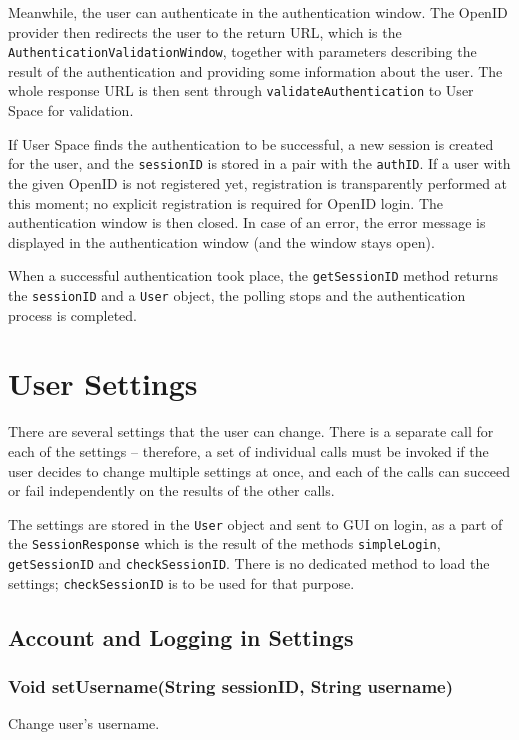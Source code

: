 {Meanwhile, the user can authenticate in the authentication window. The OpenID provider then redirects the user to the return URL, which is the {\tt AuthenticationValidationWindow}, together with parameters describing the result of the authentication and providing some information about the user.
The whole response URL is then sent through {\tt validateAuthentication} to User Space for validation.

If User Space finds the authentication to be successful, a new session is created for the user, and the {\tt sessionID} is stored in a pair with the {\tt authID}.
If a user with the given OpenID is not registered yet, registration is transparently performed at this moment; no explicit registration is required for OpenID login.
The authentication window is then closed.
In case of an error, the error message is displayed in the authentication window (and the window stays open).

When a successful authentication took place, the {\tt getSessionID} method returns the {\tt sessionID} and a {\tt User} object, the polling stops and the authentication process is completed.

\section{User Settings}
\label{sec:rpc:settings}

There are several settings that the user can change. There is a separate call for each of the settings -- therefore, a set of individual calls must be invoked if the user decides to change multiple settings at once, and each of the calls can succeed or fail independently on the results of the other calls.

The settings are stored in the {\tt User} object and sent to GUI on login, as a part of the {\tt SessionResponse} which is the result of the methods {\tt simpleLogin}, {\tt getSessionID} and {\tt checkSessionID}. There is no dedicated method to load the settings; {\tt checkSessionID} is to be used for that purpose.

\subsection{Account and Logging in Settings}

\subsubsection{Void setUsername(String sessionID, String username)}
Change user's username.

}
